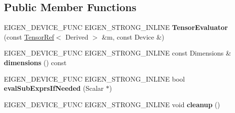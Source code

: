 \subsection*{Public Member Functions}
\begin{DoxyCompactItemize}
\item 
\mbox{\label{struct_eigen_1_1_tensor_evaluator_3_01const_01_tensor_ref_3_01_derived_01_4_00_01_device_01_4_a26e1315e9986cf87e8f70c213a20ba53}} 
E\+I\+G\+E\+N\+\_\+\+D\+E\+V\+I\+C\+E\+\_\+\+F\+U\+NC E\+I\+G\+E\+N\+\_\+\+S\+T\+R\+O\+N\+G\+\_\+\+I\+N\+L\+I\+NE {\bfseries Tensor\+Evaluator} (const \hyperlink{class_eigen_1_1_tensor_ref}{Tensor\+Ref}$<$ Derived $>$ \&m, const Device \&)
\item 
\mbox{\label{struct_eigen_1_1_tensor_evaluator_3_01const_01_tensor_ref_3_01_derived_01_4_00_01_device_01_4_a9ef51ea99b50bafe25c0e9b74f6a347f}} 
E\+I\+G\+E\+N\+\_\+\+D\+E\+V\+I\+C\+E\+\_\+\+F\+U\+NC E\+I\+G\+E\+N\+\_\+\+S\+T\+R\+O\+N\+G\+\_\+\+I\+N\+L\+I\+NE const Dimensions \& {\bfseries dimensions} () const
\item 
\mbox{\label{struct_eigen_1_1_tensor_evaluator_3_01const_01_tensor_ref_3_01_derived_01_4_00_01_device_01_4_afe6280141118e1a9314fc206ee92756e}} 
E\+I\+G\+E\+N\+\_\+\+D\+E\+V\+I\+C\+E\+\_\+\+F\+U\+NC E\+I\+G\+E\+N\+\_\+\+S\+T\+R\+O\+N\+G\+\_\+\+I\+N\+L\+I\+NE bool {\bfseries eval\+Sub\+Exprs\+If\+Needed} (Scalar $\ast$)
\item 
\mbox{\label{struct_eigen_1_1_tensor_evaluator_3_01const_01_tensor_ref_3_01_derived_01_4_00_01_device_01_4_aacc7160fed84bb1a69032b15c49c8aa9}} 
E\+I\+G\+E\+N\+\_\+\+D\+E\+V\+I\+C\+E\+\_\+\+F\+U\+NC E\+I\+G\+E\+N\+\_\+\+S\+T\+R\+O\+N\+G\+\_\+\+I\+N\+L\+I\+NE void {\bfseries cleanup} ()
\item 
\mbox{\label{struct_eigen_1_1_tensor_evaluator_3_01const_01_tensor_ref_3_01_derived_01_4_00_01_device_01_4_a6475ac3c31557f7ccb668347328547ab}} 

\end{DoxyCompactItemize}
